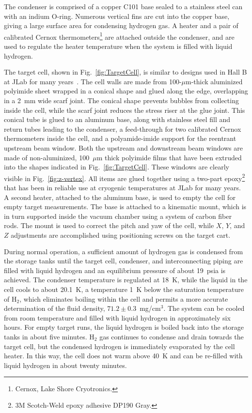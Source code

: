 The condenser is comprised of a copper C101 base
sealed to a stainless steel can with an indium O-ring.  Numerous vertical 
fins are cut into the copper base, giving a large surface area for condensing hydrogen gas.
A heater and a pair of calibrated Cernox thermometers\footnote{Cernox, Lake Shore Cryotronics.}
are attached outside the condenser, and are used to regulate the heater temperature when the
system is filled with liquid hydrogen.

The target cell, shown in Fig.~\ref{fig:TargetCell}, is similar to
designs used in Hall B at JLab for many years~\cite{HAKOBYAN2008218}.  
The cell walls are made from 100-$\mu$m-thick aluminized
polyimide sheet wrapped in a conical shape and glued along the edge,
overlapping in a 2~mm wide scarf joint.  
The conical shape prevents bubbles from collecting inside the cell, while the
scarf joint reduces the stress riser at the glue joint.  This conical
tube is glued to an aluminum base, 
along with stainless steel fill and return tubes leading to the condenser, a feed-through for two calibrated Cernox thermometers inside the cell, and a
polyamide-imide support for the reentrant upstream beam window.  
Both the upstream and downstream beam
windows are made of non-aluminized,
100~$\mu$m thick polyimide films that have been extruded into the
shapes indicated in Fig.~\ref{fig:TargetCell}. These windows are clearly
visible in Fig.~\ref{fig:z-vertex}. All items are glued together using
a two-part epoxy\footnote{3M Scotch-Weld epoxy adhesive DP190 Gray.}
that has been in reliable use at cryogenic temperatures at
JLab for many years. 
A second  heater, attached to the aluminum base,
is used to empty the cell for empty target measurements.
The base is attached to a kinematic mount, which is in turn
supported inside the vacuum chamber using a system of carbon fiber rods.    
The mount is used to correct the pitch and yaw
of the cell, while $X$, $Y$, and $Z$ adjustments 
are accomplished using positioning screws on the target cart. 


During normal operation, a sufficient amount of hydrogen gas is condensed from the storage tanks
until the target cell, condenser, and interconnecting piping are filled with liquid hydrogen
and an equilibrium pressure of about 19~psia is achieved.  
The condenser temperature is regulated at 18~K, while the
liquid in the cell cools to about 20.1~K, a temperature 1~K below the saturation
temperature of H$_2$, which eliminates boiling within the cell and permits a more
accurate determination of the fluid density, 
$71.2 \pm 0.3$~mg/cm$^3$.  
The system can be cooled from room temperature and filled with liquid hydrogen in
approximately six hours.  For empty target runs, the liquid hydrogen is boiled back into the storage tanks in about five minutes.  H$_2$ gas continues to condense and drain towards the target cell, but the condensed hydrogen is immediately 
evaporated by the cell heater.  In this way, the cell does not warm above 40~K and
can be re-filled with liquid hydrogen in about twenty minutes.

